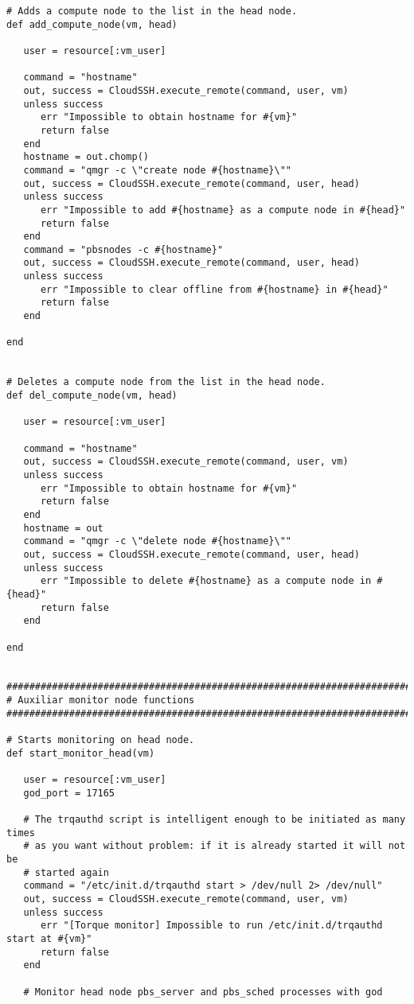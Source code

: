 \begin{lstlisting}
# Adds a compute node to the list in the head node.
def add_compute_node(vm, head)

   user = resource[:vm_user]

   command = "hostname"
   out, success = CloudSSH.execute_remote(command, user, vm)
   unless success
      err "Impossible to obtain hostname for #{vm}"
      return false
   end
   hostname = out.chomp()
   command = "qmgr -c \"create node #{hostname}\""
   out, success = CloudSSH.execute_remote(command, user, head)
   unless success
      err "Impossible to add #{hostname} as a compute node in #{head}"
      return false
   end
   command = "pbsnodes -c #{hostname}"
   out, success = CloudSSH.execute_remote(command, user, head)
   unless success
      err "Impossible to clear offline from #{hostname} in #{head}"
      return false
   end
   
end


# Deletes a compute node from the list in the head node.
def del_compute_node(vm, head)

   user = resource[:vm_user]
   
   command = "hostname"
   out, success = CloudSSH.execute_remote(command, user, vm)
   unless success
      err "Impossible to obtain hostname for #{vm}"
      return false
   end
   hostname = out
   command = "qmgr -c \"delete node #{hostname}\""
   out, success = CloudSSH.execute_remote(command, user, head)
   unless success
      err "Impossible to delete #{hostname} as a compute node in #{head}"
      return false
   end
   
end


################################################################################
# Auxiliar monitor node functions
################################################################################

# Starts monitoring on head node.
def start_monitor_head(vm)
   
   user = resource[:vm_user]
   god_port = 17165
   
   # The trqauthd script is intelligent enough to be initiated as many times
   # as you want without problem: if it is already started it will not be
   # started again
   command = "/etc/init.d/trqauthd start > /dev/null 2> /dev/null"
   out, success = CloudSSH.execute_remote(command, user, vm)
   unless success
      err "[Torque monitor] Impossible to run /etc/init.d/trqauthd start at #{vm}"
      return false
   end
   
   # Monitor head node pbs_server and pbs_sched processes with god
   

\end{lstlisting}
